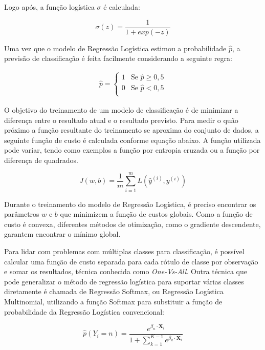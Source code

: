 \documentclass[portugues]{ic-tese}
\begin{document}
Logo após, a função logística $\sigma$ é calculada:

\begin{equation}
\sigma (z) = \frac{1}{1 + exp(-z)}
\end{equation}

Uma vez que o modelo de Regressão Logística estimou a probabilidade $\hat{p}$, a previsão de classificação é feita facilmente considerando a seguinte regra:

\begin{equation}
	\begin{aligned}
	\hat{p} = 
	\begin{cases}
	1 & \text{Se $\hat{p} \geq 0,5$}\\
	0 & \text{Se $\hat{p} < 0,5$}\\
	\end{cases}
	\end{aligned}
\end{equation}

O objetivo do treinamento de um modelo de classificação é de minimizar a diferença entre o resultado atual e o resultado previsto. Para medir o quão próximo a função resultante do treinamento se aproxima do conjunto de dados, a seguinte função de custo é calculada conforme equação abaixo. A função utilizada pode variar, tendo como exemplos a função por entropia cruzada ou a função por diferença de quadrados.

\begin{equation}
J(w,b) = \frac{1}{m} \sum^{m}_{i=1} L(\hat{y}^{(i)}, y^{(i)})
\end{equation}

Durante o treinamento do modelo de Regressão Logística, é preciso encontrar os parâmetros $w$ e $b$ que minimizem a função de custos globais. Como a função de custo é convexa, diferentes métodos de otimização, como o gradiente descendente, garantem encontrar o mínimo global.

Para lidar com problemas com múltiplas classes para classificação, é possível calcular uma função de custo separada para cada rótulo de classe por observação e somar os resultados, técnica conhecida como \textit{One-Vs-All}. Outra técnica que pode generalizar o método de regressão logística para suportar várias classes diretamente é chamada de Regressão Softmax, ou Regressão Logística Multinomial, utilizando a função Softmax para substituir a função de probabilidade da Regressão Logística convencional:

\begin{equation}
\hat{p}(Y_i = n) = \frac{e^{\beta_{n} \cdot \textbf{X}_{i}}}{1 + \sum^{K-1}_{k=1} e^{\beta_{k} \cdot \textbf{X}_{i}}}
\end{equation}
\end{document}

